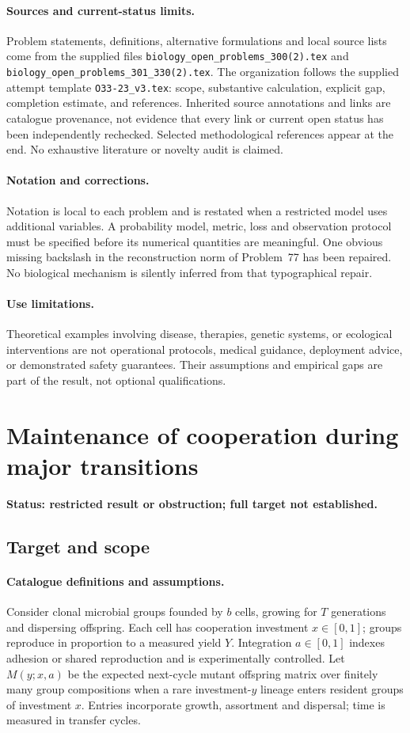 \documentclass[11pt]{article}
\begin{document}
\paragraph{Sources and current-status limits.}
Problem statements, definitions, alternative formulations and local source lists
come from the supplied files
\texttt{biology\_open\_problems\_300(2).tex} and
\texttt{biology\_open\_problems\_301\_330(2).tex}.
The organization follows the supplied attempt template
\texttt{O33-23\_v3.tex}: scope, substantive calculation, explicit gap,
completion estimate, and references. Inherited source annotations and links are
catalogue provenance, not evidence that every link or current open status has
been independently rechecked. Selected methodological references appear at the
end. No exhaustive literature or novelty audit is claimed.

\paragraph{Notation and corrections.}
Notation is local to each problem and is restated when a restricted model uses
additional variables. A probability model, metric, loss and observation protocol
must be specified before its numerical quantities are meaningful. One obvious
missing backslash in the reconstruction norm of Problem~77 has been repaired.
No biological mechanism is silently inferred from that typographical repair.

\paragraph{Use limitations.}
Theoretical examples involving disease, therapies, genetic systems, or ecological
interventions are not operational protocols, medical guidance, deployment advice,
or demonstrated safety guarantees. Their assumptions and empirical gaps are part
of the result, not optional qualifications.


\section*{Maintenance of cooperation during major transitions}
\label{prob:151}
\noindent\textbf{Status: restricted result or obstruction; full target not established.}
\subsection{Target and scope}
\paragraph{Catalogue definitions and assumptions.}
Consider clonal microbial groups founded by $b$ cells, growing for $T$ generations and dispersing offspring. Each cell has cooperation investment $x\in[0,1]$; groups reproduce in proportion to a measured yield $Y$. Integration $a\in[0,1]$ indexes adhesion or shared reproduction and is experimentally controlled. Let $M(y;x,a)$ be the expected next-cycle mutant offspring matrix over finitely many group compositions when a rare investment-$y$ lineage enters resident groups of investment $x$. Entries incorporate growth, assortment and dispersal; time is measured in transfer cycles.
\end{document}
